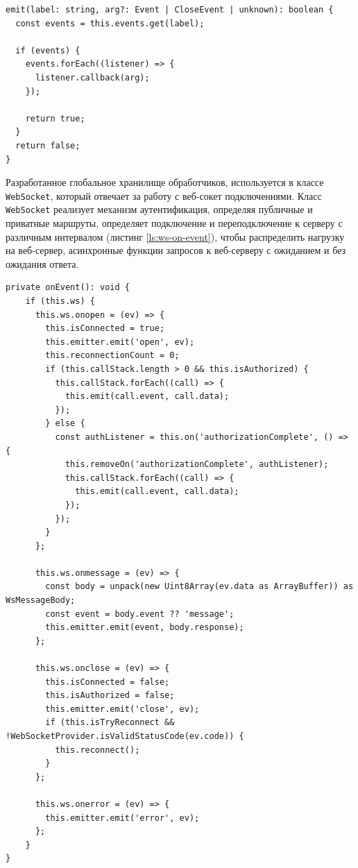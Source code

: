 \begin{lstlisting}[caption={Метод вызова события из класса Emit}, label={ls:emit}]
emit(label: string, arg?: Event | CloseEvent | unknown): boolean {
  const events = this.events.get(label);

  if (events) {
    events.forEach((listener) => {
      listener.callback(arg);
    });

    return true;
  }
  return false;
}
\end{lstlisting}

Разработанное глобальное хранилище обработчиков, используется в классе \verb|WebSocket|, который отвечает за работу с веб-сокет подключениями. Класс \verb|WebSocket| реализует механизм аутентификация, определяя публичные и приватные маршруты, определяет подключение и переподключение к серверу с различным интервалом (листинг \ref{ls:ws-on-event}), чтобы распределить нагрузку на веб-сервер, асинхронные функции запросов к веб-серверу с ожиданием и без ожидания ответа.

\begin{lstlisting}[caption={Метод из класса WebSocket, передающий события в глобальную шину}, label={ls:ws-on-event}]
private onEvent(): void {
    if (this.ws) {
      this.ws.onopen = (ev) => {
        this.isConnected = true;
        this.emitter.emit('open', ev);
        this.reconnectionCount = 0;
        if (this.callStack.length > 0 && this.isAuthorized) {
          this.callStack.forEach((call) => {
            this.emit(call.event, call.data);
          });
        } else {
          const authListener = this.on('authorizationComplete', () => {
            this.removeOn('authorizationComplete', authListener);
            this.callStack.forEach((call) => {
              this.emit(call.event, call.data);
            });
          });
        }
      };

      this.ws.onmessage = (ev) => {
        const body = unpack(new Uint8Array(ev.data as ArrayBuffer)) as WsMessageBody;
        const event = body.event ?? 'message';
        this.emitter.emit(event, body.response);
      };

      this.ws.onclose = (ev) => {
        this.isConnected = false;
        this.isAuthorized = false;
        this.emitter.emit('close', ev);
        if (this.isTryReconnect && !WebSocketProvider.isValidStatusCode(ev.code)) {
          this.reconnect();
        }
      };

      this.ws.onerror = (ev) => {
        this.emitter.emit('error', ev);
      };
    }
}
\end{lstlisting}

